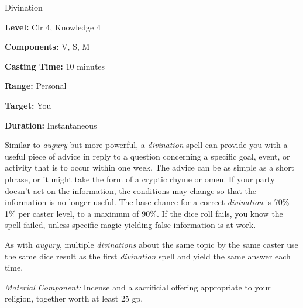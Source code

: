 
Divination

\textbf{Level:} Clr 4, Knowledge 4

\textbf{Components:} V, S, M

\textbf{Casting Time:} 10 minutes

\textbf{Range:} Personal

\textbf{Target:} You

\textbf{Duration:} Instantaneous 

Similar to \textit{augury} but more powerful, a \textit{divination} spell can provide 
you with a useful piece of advice in reply to a question concerning a specific 
goal, event, or activity that is to occur within one week. The advice can be as 
simple as a short phrase, or it might take the form of a cryptic rhyme or omen. 
If your party doesn't act on the information, the conditions may change so that 
the information is no longer useful. The base chance for a correct \textit{divination 
}is 70\% + 1\% per caster level, to a maximum of 90\%. If the dice roll fails, 
you know the spell failed, unless specific magic yielding false information is 
at work.

As with \textit{augury}, multiple \textit{divinations} about the same topic by 
the same caster use the same dice result as the first \textit{divination} spell 
and yield the same answer each time.

\textit{Material Component:} Incense and a sacrificial offering appropriate to 
your religion, together worth at least 25 gp.


